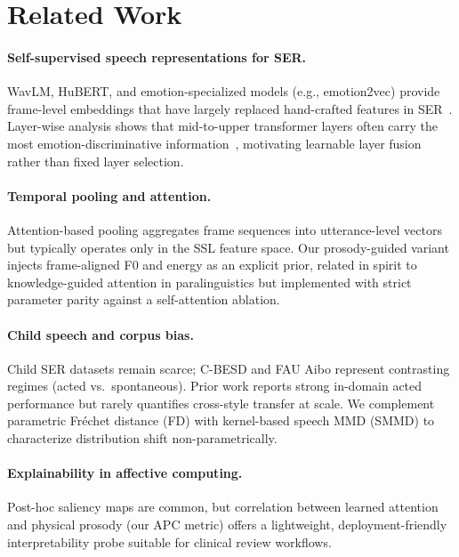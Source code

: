 \section{Related Work}
\label{sec:related_work}

\paragraph{Self-supervised speech representations for SER.}
WavLM, HuBERT, and emotion-specialized models (e.g., emotion2vec) provide frame-level embeddings that have largely replaced hand-crafted features in SER~\cite{chen2022wavlm,wagner2023dawn}.
Layer-wise analysis shows that mid-to-upper transformer layers often carry the most emotion-discriminative information~\cite{pasad2021layer}, motivating learnable layer fusion rather than fixed layer selection.

\paragraph{Temporal pooling and attention.}
Attention-based pooling aggregates frame sequences into utterance-level vectors but typically operates only in the SSL feature space.
Our prosody-guided variant injects frame-aligned F0 and energy as an explicit prior, related in spirit to knowledge-guided attention in paralinguistics but implemented with strict parameter parity against a self-attention ablation.

\paragraph{Child speech and corpus bias.}
Child SER datasets remain scarce; C-BESD and FAU Aibo represent contrasting regimes (acted vs.\ spontaneous).
Prior work reports strong in-domain acted performance but rarely quantifies cross-style transfer at scale.
We complement parametric Fr\'{e}chet distance (FD) with kernel-based speech MMD (SMMD) to characterize distribution shift non-parametrically.

\paragraph{Explainability in affective computing.}
Post-hoc saliency maps are common, but correlation between learned attention and physical prosody (our APC metric) offers a lightweight, deployment-friendly interpretability probe suitable for clinical review workflows.
